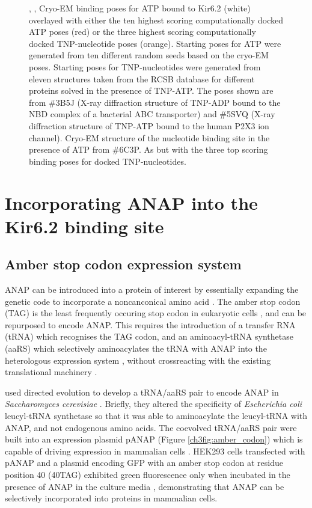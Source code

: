 \begin{figure}[h]
	\caption[TNP-nucleotides can bind with a similar pose to ATP]{
	, ,  Cryo-EM binding poses for ATP bound to Kir6.2 (white) overlayed with either the ten highest scoring computationally docked ATP poses (red) or the three highest scoring computationally docked TNP-nucleotide poses (orange).
	Starting poses for ATP were generated from ten different random seeds based on the cryo-EM poses.
	Starting poses for TNP-nucleotides were generated from eleven structures taken from the RCSB database for different proteins solved in the presence of TNP-ATP.
	The poses shown are from \#3B5J (X-ray diffraction structure of TNP-ADP bound to the NBD complex of a bacterial ABC transporter) and \#5SVQ (X-ray diffraction structure of TNP-ATP bound to the human P2X3 ion channel).
	 Cryo-EM structure of the nucleotide binding site in the presence of ATP from \#6C3P.
	 As  but with the three top scoring binding poses for docked TNP-nucleotides.
	}\label{ch3fig:docking}
\end{figure}

\section{Incorporating ANAP into the Kir6.2 binding site}

\subsection{Amber stop codon expression system}

ANAP can be introduced into a protein of interest by essentially expanding the genetic code to incorporate a noncanconical amino acid \cite{chin_expanding_2017}.
The amber stop codon (TAG) is the least frequently occuring stop codon in eukaryotic cells \cite{cridge_eukaryotic_2018}, and can be repurposed to encode ANAP.
This requires the introduction of a transfer RNA (tRNA) which recognises the TAG codon, and an aminoacyl-tRNA synthetase (aaRS) which selectively aminoacylates the tRNA with ANAP into the heterologous expression system , without crossreacting with the existing translational machinery \cite{lee_genetic_2009, chatterjee_genetically_2013}.

\citeauthor{lee_genetic_2009} used directed evolution to develop a tRNA/aaRS pair to encode ANAP in \textit{Saccharomyces cerevisiae} \cite{lee_genetic_2009}.
Briefly, they altered the specificity of \textit{Escherichia coli} leucyl-tRNA synthetase so that it was able to aminoacylate the leucyl-tRNA with ANAP, and not endogenous amino acids.
The coevolved tRNA/aaRS pair were built into an expression plasmid pANAP (Figure \ref{ch3fig:amber_codon}) which is capable of driving expression in mammalian cells \cite{chatterjee_genetically_2013}.
HEK293 cells transfected with pANAP and a plasmid encoding GFP with an amber stop codon at residue position 40 (40TAG) exhibited green fluorescence only when incubated in the presence of ANAP in the culture media \cite{chatterjee_genetically_2013}, demonstrating that ANAP can be selectively incorporated into proteins in mammalian cells.

